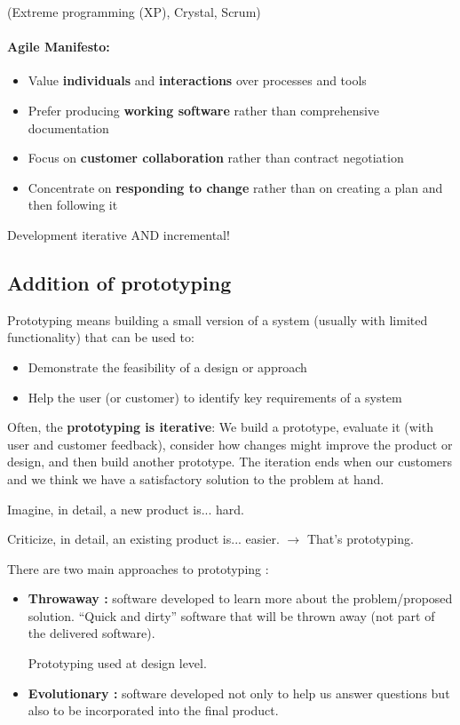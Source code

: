 (Extreme programming (XP), Crystal, Scrum)


\paragraph{Agile Manifesto:}

\begin{itemize}
    \item Value \textbf{individuals} and \textbf{interactions} over processes and tools
    \item Prefer producing \textbf{working software} rather than comprehensive documentation
    \item Focus on \textbf{customer collaboration} rather than contract negotiation
    \item Concentrate on \textbf{responding to change} rather than on creating a plan and then following it
\end{itemize}

Development iterative AND incremental! 


\subsection{Addition of prototyping}

Prototyping means building a small version of a system (usually with limited
functionality) that can be used to:

\begin{itemize}
    \item Demonstrate the feasibility of a design or approach
    \item Help the user (or customer) to identify key requirements of a system
\end{itemize}


Often, the \textbf{prototyping is iterative}: We build a prototype, evaluate it (with
user and customer feedback), consider how changes might improve the product or
design, and then build another prototype. The iteration ends when our customers
and we think we have a satisfactory solution to the problem at hand.

\begin{center}
Imagine, in detail, a new product is... hard.


Criticize, in detail, an existing product is... easier.
 $\rightarrow$ That's prototyping.
 \end{center}


There are two main approaches to prototyping :

\begin{itemize}
    \item \textbf{Throwaway :} software developed to learn more about the
    problem/proposed solution. “Quick and dirty” software that will be thrown
    away (not part of the delivered software).

    Prototyping used at design level.

    \item \textbf{Evolutionary :} software developed not only to help us answer questions
    but also to be incorporated into the final product.
\end{itemize}

